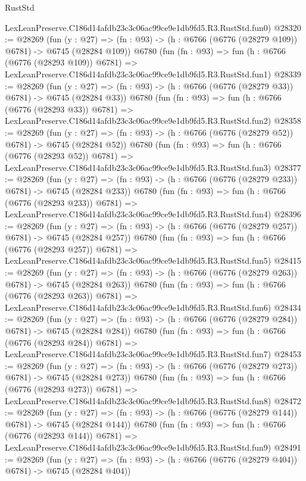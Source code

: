 \begin{lexlean}{RustStd}
\begin{coremodule}
    LexLeanPreserve.C186d14afdb23c3c06ac99ce9e1db9fd5.R3.RustStd.fun0)
@28320 := @28269
    (fun (y : @27) => (fn : @93) -> (h : @6766 (@6776 (@28279 @109)) @6781) -> @6745 (@28284 @109))
    @6780
    (fun (fn : @93) =>
    fun (h : @6766 (@6776 (@28293 @109)) @6781) =>
    LexLeanPreserve.C186d14afdb23c3c06ac99ce9e1db9fd5.R3.RustStd.fun1)
@28339 := @28269
    (fun (y : @27) => (fn : @93) -> (h : @6766 (@6776 (@28279 @33)) @6781) -> @6745 (@28284 @33))
    @6780
    (fun (fn : @93) =>
    fun (h : @6766 (@6776 (@28293 @33)) @6781) =>
    LexLeanPreserve.C186d14afdb23c3c06ac99ce9e1db9fd5.R3.RustStd.fun2)
@28358 := @28269
    (fun (y : @27) => (fn : @93) -> (h : @6766 (@6776 (@28279 @52)) @6781) -> @6745 (@28284 @52))
    @6780
    (fun (fn : @93) =>
    fun (h : @6766 (@6776 (@28293 @52)) @6781) =>
    LexLeanPreserve.C186d14afdb23c3c06ac99ce9e1db9fd5.R3.RustStd.fun3)
@28377 := @28269
    (fun (y : @27) => (fn : @93) -> (h : @6766 (@6776 (@28279 @233)) @6781) -> @6745 (@28284 @233))
    @6780
    (fun (fn : @93) =>
    fun (h : @6766 (@6776 (@28293 @233)) @6781) =>
    LexLeanPreserve.C186d14afdb23c3c06ac99ce9e1db9fd5.R3.RustStd.fun4)
@28396 := @28269
    (fun (y : @27) => (fn : @93) -> (h : @6766 (@6776 (@28279 @257)) @6781) -> @6745 (@28284 @257))
    @6780
    (fun (fn : @93) =>
    fun (h : @6766 (@6776 (@28293 @257)) @6781) =>
    LexLeanPreserve.C186d14afdb23c3c06ac99ce9e1db9fd5.R3.RustStd.fun5)
@28415 := @28269
    (fun (y : @27) => (fn : @93) -> (h : @6766 (@6776 (@28279 @263)) @6781) -> @6745 (@28284 @263))
    @6780
    (fun (fn : @93) =>
    fun (h : @6766 (@6776 (@28293 @263)) @6781) =>
    LexLeanPreserve.C186d14afdb23c3c06ac99ce9e1db9fd5.R3.RustStd.fun6)
@28434 := @28269
    (fun (y : @27) => (fn : @93) -> (h : @6766 (@6776 (@28279 @284)) @6781) -> @6745 (@28284 @284))
    @6780
    (fun (fn : @93) =>
    fun (h : @6766 (@6776 (@28293 @284)) @6781) =>
    LexLeanPreserve.C186d14afdb23c3c06ac99ce9e1db9fd5.R3.RustStd.fun7)
@28453 := @28269
    (fun (y : @27) => (fn : @93) -> (h : @6766 (@6776 (@28279 @273)) @6781) -> @6745 (@28284 @273))
    @6780
    (fun (fn : @93) =>
    fun (h : @6766 (@6776 (@28293 @273)) @6781) =>
    LexLeanPreserve.C186d14afdb23c3c06ac99ce9e1db9fd5.R3.RustStd.fun8)
@28472 := @28269
    (fun (y : @27) => (fn : @93) -> (h : @6766 (@6776 (@28279 @144)) @6781) -> @6745 (@28284 @144))
    @6780
    (fun (fn : @93) =>
    fun (h : @6766 (@6776 (@28293 @144)) @6781) =>
    LexLeanPreserve.C186d14afdb23c3c06ac99ce9e1db9fd5.R3.RustStd.fun9)
@28491 := @28269
    (fun (y : @27) => (fn : @93) -> (h : @6766 (@6776 (@28279 @404)) @6781) -> @6745 (@28284 @404))

\end{coremodule}
\end{lexlean}
